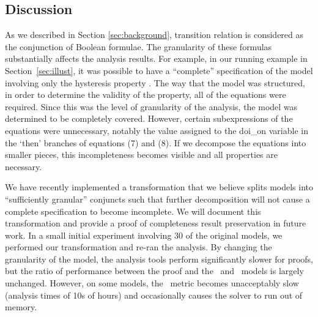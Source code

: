 \subsection{Discussion}
\label{sec:discussion}

As we described in Section \ref{sec:background}, transition relation is considered
as the conjunction of Boolean formulae.   The granularity of these formulas substantially affects the analysis results.  For example, in our running example in Section~\ref{sec:illust}, it was possible to have a ``complete'' specification of the model involving only the hysteresis property \hystp.  The way that the model was structured, in order to determine the validity of the property, all of the equations were required.  Since this was the level of granularity of the analysis, the model was determined to be completely covered.  However, certain subexpressions of the equations were unnecessary, notably the value assigned to the doi\_on variable in the `then' branches of equations (7) and (8).  If we decompose the equations into smaller pieces, this incompleteness becomes visible and all properties are necessary.



%
We have recently implemented a transformation that we believe splits models into ``sufficiently granular'' conjuncts such that further decomposition will not cause a complete specification to become incomplete.  We will document this transformation and provide a proof of completeness result preservation in future work.
%
In a small initial experiment involving 30 of the original models, we performed our transformation and re-ran the analysis.  By changing the granularity of the model, the analysis tools perform significantly slower for proofs, but the ratio of performance between the proof and the \ucalg\ and \nondetcov\ models is largely unchanged.  However, on some models, the \nondetcov\ metric becomes unacceptably slow (analysis times of 10s of hours) and occasionally causes the solver to run out of memory.

